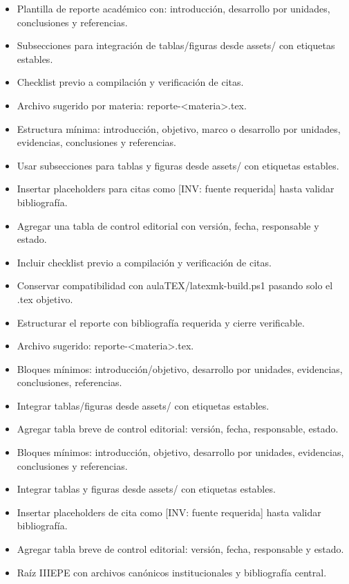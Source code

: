 \documentclass[12pt]{article}
\begin{document}
\begin{itemize}[leftmargin=*]
  \item Plantilla de reporte académico con: introducción, desarrollo por unidades, conclusiones y referencias.
  \item Subsecciones para integración de tablas/figuras desde assets/ con etiquetas estables.
  \item Checklist previo a compilación y verificación de citas.
  \item Archivo sugerido por materia: reporte-<materia>.tex.
  \item Estructura mínima: introducción, objetivo, marco o desarrollo por unidades, evidencias, conclusiones y referencias.
  \item Usar subsecciones para tablas y figuras desde assets/ con etiquetas estables.
  \item Insertar placeholders para citas como [INV: fuente requerida] hasta validar bibliografía.
  \item Agregar una tabla de control editorial con versión, fecha, responsable y estado.
  \item Incluir checklist previo a compilación y verificación de citas.
  \item Conservar compatibilidad con aulaTEX/latexmk-build.ps1 pasando solo el .tex objetivo.
  \item Estructurar el reporte con bibliografía requerida y cierre verificable.
  \item Archivo sugerido: reporte-<materia>.tex.
  \item Bloques mínimos: introducción/objetivo, desarrollo por unidades, evidencias, conclusiones, referencias.
  \item Integrar tablas/figuras desde assets/ con etiquetas estables.
  \item Agregar tabla breve de control editorial: versión, fecha, responsable, estado.
  \item Bloques mínimos: introducción, objetivo, desarrollo por unidades, evidencias, conclusiones y referencias.
  \item Integrar tablas y figuras desde assets/ con etiquetas estables.
  \item Insertar placeholders de cita como [INV: fuente requerida] hasta validar bibliografía.
  \item Agregar tabla breve de control editorial: versión, fecha, responsable y estado.
  \item Raíz IIIEPE con archivos canónicos institucionales y bibliografía central.

\end{itemize}
\end{document}
